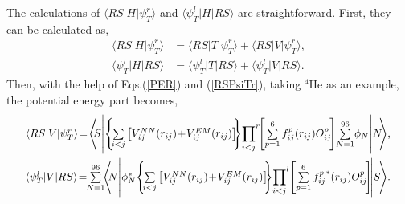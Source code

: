 \documentclass[12pt,letterpaper,UTF8]{report}
\begin{document}
The calculations of $\langle R S| H | \psi^r_T \rangle$ and $\langle \psi^l_T| H | R S\rangle$ are straightforward. First, they can be calculated as,
\begin{align}
\langle R S| H | \psi^r_T \rangle &= \langle R S| T | \psi^r_T \rangle + \langle R S| V | \psi^r_T \rangle,  \\
\langle \psi^l_T| H | R S\rangle &= \langle \psi^l_T| T | R S\rangle + \langle \psi^l_T| V | R S\rangle.
\label{RSHPsiTrcalc}
\end{align}
Then, with the help of Eqs.(\ref{PER}) and (\ref{RSPsiTr}), taking $^4$He as an example, the potential energy part becomes,
\begin{eqnarray}
\resizebox{.9\hsize}{!}{$
\!\!\!\!\!\!\!\!\! \langle R S| V | \psi^r_T \rangle \!=\!
\left\langle \!\! S \! \left| \left\{\! \sum\limits_{i<j} \left[V_{ij}^{NN}(r_{ij}) \!+\! V^{EM}_{ij}(r_{ij}) \right] \!\! \right\}
\! \! \sideset{}{^r} \prod\limits_{i<j} \! \!
\left[
\sum\limits_{p=1}^6   f_{ij}^p (r_{ij})  O_{ij}^p\!
\right]
\! \sum\limits_{N=1}^{96} \! \phi_N
\right| \! N \!\! \right\rangle$,} \\
\resizebox{.938\hsize}{!}{ $
\!\!\! \langle \psi^l_T| V | R S\rangle \!=\!
\! \sum \limits_{N=1}^{96}  \!\! \left\langle \!\! N \! \left| \phi^*_N \!
 \left\{\! \sum\limits_{i<j} \left[V_{ij}^{NN}(r_{ij}) \!+\! V^{EM}_{ij}(r_{ij}) \right]\!\! \right\}
\!\! \sideset{}{^l} \prod\limits_{i<j}\!
\left[
\sum\limits_{p=1}^6 {f_{ij}^p}^* (r_{ij})  O_{ij}^p\!
\right] \!
\right| \! S \! \right\rangle$.}
\end{eqnarray}
\end{document}
